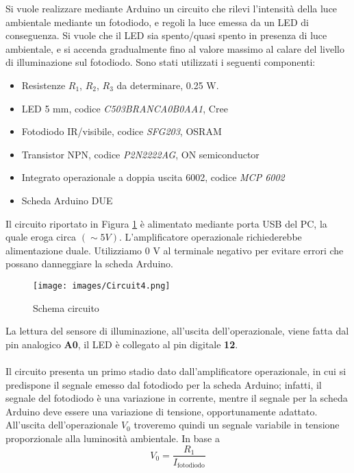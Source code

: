 Si vuole realizzare mediante Arduino un circuito che rilevi l’intensità della luce ambientale mediante un fotodiodo, e regoli la luce emessa da un LED di conseguenza. Si vuole che il LED sia spento/quasi spento in presenza di luce ambientale, e si accenda gradualmente fino al valore massimo al calare del livello di illuminazione sul fotodiodo. Sono stati utilizzati i seguenti componenti:
\begin{itemize}
    \item Resistenze $R_1$, $R_2$, $R_3$ da determinare, 0.25 W.
    \item LED 5 mm,  codice \textit{C503BRANCA0B0AA1}, Cree 
    \item Fotodiodo IR/visibile, codice \textit{SFG203}, OSRAM
    \item Transistor NPN, codice \textit{P2N2222AG}, ON semiconductor
    \item Integrato operazionale a doppia uscita 6002, codice \textit{MCP 6002}
    \item Scheda Arduino DUE
\end{itemize}
Il circuito riportato in Figura \ref{fig:Circuit4} è alimentato mediante porta USB del PC, la quale eroga circa $(\sim 5 V)$. L'amplificatore operazionale richiederebbe alimentazione duale. Utilizziamo 0 V al terminale negativo per evitare errori che possano danneggiare la scheda Arduino.
\begin{figure}[H]
    \centering
    \texttt{[image: images/Circuit4.png]}
    \caption{Schema circuito}
    \label{fig:Circuit4}
\end{figure}
La lettura del sensore di illuminazione, all'uscita dell'operazionale, viene fatta dal pin analogico \textbf{A0}, il LED è collegato al pin digitale \textbf{12}.\\\\
Il circuito presenta un primo stadio dato dall'amplificatore operazionale, in cui si predispone il segnale emesso dal fotodiodo per la scheda Arduino; infatti, il segnale del fotodiodo è una variazione in corrente, mentre il segnale per la scheda Arduino deve essere una variazione di tensione, opportunamente adattato. All'uscita dell'operazionale $V_0$ troveremo quindi un segnale variabile in tensione proporzionale alla luminosità ambientale. In base a 
\begin{equation}
    V_0=\frac{R_1}{I_{\text{fotodiodo}}}
\end{equation}
\clearpage
